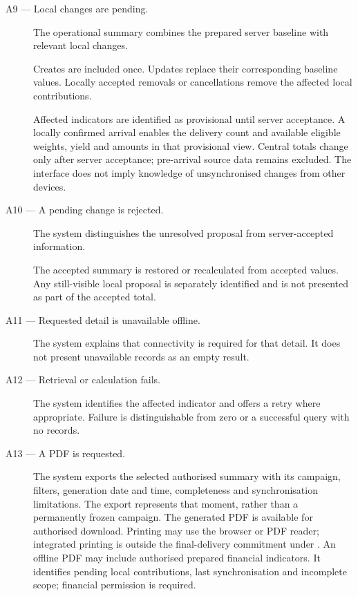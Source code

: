 \begin{description}
    \item[A9 --- Local changes are pending.]
    The operational summary combines the prepared
    server baseline with relevant local changes.

    Creates are included once.
    Updates replace their corresponding baseline values.
    Locally accepted removals or cancellations
    remove the affected local contributions.

    Affected indicators are identified as provisional
    until server acceptance.
    A locally confirmed arrival enables the delivery count and available eligible
    weights, yield and amounts in that provisional view. Central totals change only
    after server acceptance; pre-arrival source data remains excluded.
    The interface does not imply knowledge
    of unsynchronised changes from other devices.

    \item[A10 --- A pending change is rejected.]
    The system distinguishes the unresolved proposal
    from server-accepted information.

    The accepted summary is restored or recalculated
    from accepted values.
    Any still-visible local proposal is separately
    identified and is not presented
    as part of the accepted total.

    \item[A11 --- Requested detail is unavailable offline.]
    The system explains that connectivity
    is required for that detail.
    It does not present unavailable records
    as an empty result.

    \item[A12 --- Retrieval or calculation fails.]
    The system identifies the affected indicator
    and offers a retry where appropriate.
    Failure is distinguishable from zero
    or a successful query with no records.

    \item[A13 --- A PDF is requested.]
    The system exports the selected authorised
    summary with its campaign, filters,
    generation date and time,
    completeness and synchronisation limitations.
    The export represents that moment,
    rather than a permanently frozen campaign.
    The generated PDF is available for authorised download. Printing may use the
    browser or PDF reader; integrated printing is outside the final-delivery
    commitment under .
    An offline PDF may include authorised prepared financial indicators. It identifies pending local contributions, last synchronisation and incomplete scope; financial permission is required.
\end{description}

